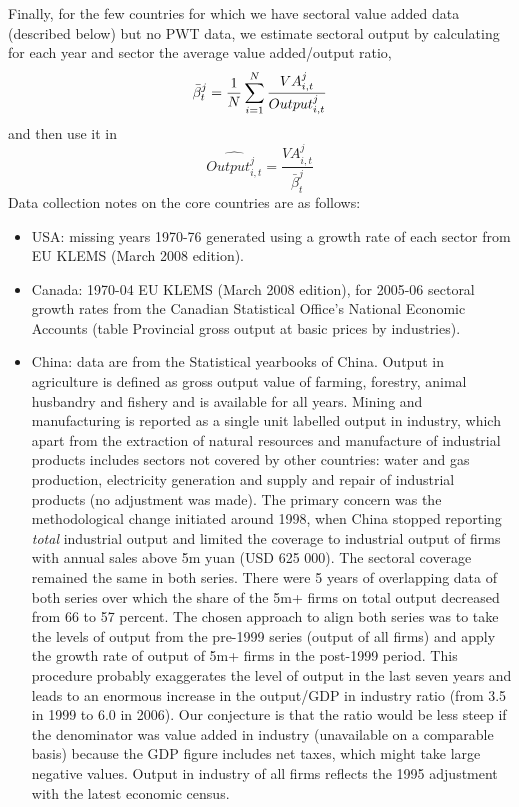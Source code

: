 \documentclass[12pt]{article}
\begin{document}
Finally, for the few countries for which we have sectoral value added data
(described below) but no PWT data, we estimate sectoral output by
calculating for each year and sector the average value added/output ratio, 
\begin{equation*}
\bar{\beta}_{t}^{j}=\frac{1}{N}\sum_{i=1}^{N}\frac{VA_{i,t}^{j}}{%
Output_{i,t}^{j}}
\end{equation*}%
and then use it in 
\begin{equation*}
\widehat{Output_{i,t}^{j}}=\frac{VA_{i,t}^{j}}{\bar{\beta}_{t}^{j}}
\end{equation*}%
Data collection notes on the core countries are as follows:

\begin{itemize}
\item USA: missing years 1970-76 generated using a growth rate of each
sector from EU KLEMS (March 2008 edition).

\item Canada: 1970-04 EU KLEMS (March 2008 edition), for 2005-06 sectoral
growth rates from the Canadian Statistical Office's National Economic
Accounts (table Provincial gross output at basic prices by industries).

\item China: data are from the Statistical yearbooks of China. Output in
agriculture is defined as gross output value of farming, forestry, animal
husbandry and fishery and is available for all years. Mining and
manufacturing is reported as a single unit labelled output in industry,
which apart from the extraction of natural resources and manufacture of
industrial products includes sectors not covered by other countries: water
and gas production, electricity generation and supply and repair of
industrial products (no adjustment was made). The primary concern was the
methodological change initiated around 1998, when China stopped reporting 
\textit{total} industrial output and limited the coverage to industrial
output of firms with annual sales above 5m yuan (USD 625 000). The sectoral
coverage remained the same in both series. There were 5 years of overlapping
data of both series over which the share of the 5m+ firms on total output
decreased from 66 to 57 percent. The chosen approach to align both series
was to take the levels of output from the pre-1999 series (output of all
firms) and apply the growth rate of output of 5m+ firms in the post-1999
period. This procedure probably exaggerates the level of output in the last
seven years and leads to an enormous increase in the output/GDP in industry
ratio (from 3.5 in 1999 to 6.0 in 2006). Our conjecture is that the ratio
would be less steep if the denominator was value added in industry
(unavailable on a comparable basis) because the GDP figure includes net
taxes, which might take large negative values. Output in industry of all
firms reflects the 1995 adjustment with the latest economic census.


\end{itemize}
\end{document}
